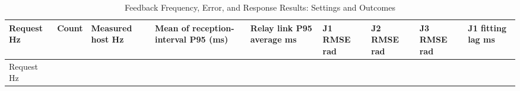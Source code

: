 \FloatBarrier\begingroup\footnotesize\setlength{\tabcolsep}{2pt}
\begin{longtable}[]{@{}
  >{\raggedright\arraybackslash}p{}
  >{\raggedleft\arraybackslash}p{}
  >{\raggedleft\arraybackslash}p{}
  >{\raggedleft\arraybackslash}p{}
  >{\raggedleft\arraybackslash}p{}
  >{\raggedleft\arraybackslash}p{}
  >{\raggedleft\arraybackslash}p{}
  >{\raggedleft\arraybackslash}p{}
  >{\raggedleft\arraybackslash}p{}@{}}
\caption{Feedback Frequency, Error, and Response Results: Settings and Outcomes}\label{tab:s05-2}\tabularnewline
\toprule\noalign{}
\begin{minipage}[b]{\linewidth}\raggedright
Request Hz
\end{minipage} & \begin{minipage}[b]{\linewidth}\raggedleft
Count
\end{minipage} & \begin{minipage}[b]{\linewidth}\raggedleft
Mea\-sured host Hz
\end{minipage} & \begin{minipage}[b]{\linewidth}\raggedleft
Mean of re\-cep\-tion-interval P95 (ms)
\end{minipage} & \begin{minipage}[b]{\linewidth}\raggedleft
Relay link P95 average ms
\end{minipage} & \begin{minipage}[b]{\linewidth}\raggedleft
J1 RMSE rad
\end{minipage} & \begin{minipage}[b]{\linewidth}\raggedleft
J2 RMSE rad
\end{minipage} & \begin{minipage}[b]{\linewidth}\raggedleft
J3 RMSE rad
\end{minipage} & \begin{minipage}[b]{\linewidth}\raggedleft
J1 fitting lag ms
\end{minipage} \\
\midrule\noalign{}
\endfirsthead
\toprule\noalign{}
\begin{minipage}[b]{\linewidth}\raggedright
Request Hz
\end{minipage} & \begin{minipage}[b]{\linewidth}\raggedleft

\end{minipage}
\end{longtable}
